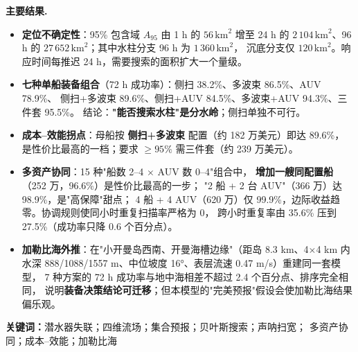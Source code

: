 \documentclass[UTF8,11pt,a4paper]{ctexart}
\newcommand{\km}{\,\mathrm{km}}
\begin{document}
\vspace{1.5mm}
\noindent\textbf{主要结果.}
\begin{itemize}[leftmargin=1.6em,itemsep=0pt,topsep=1pt]
\item \textbf{定位不确定性}：95\% 包含域 $A_{95}$ 由 1 h 的 $56\km^2$ 增至 24 h 的
      $2\,104\km^2$、96 h 的 $27\,652\km^2$；其中水柱分支 96 h 为 $1\,360\km^2$，
      沉底分支仅 $120\km^2$。响应时间每推迟 24 h，需要搜索的面积扩大一个量级。
\item \textbf{七种单船装备组合}（72 h 成功率）：侧扫 38.2\%、多波束 86.5\%、AUV 78.9\%、
      侧扫+多波束 89.6\%、侧扫+AUV 84.5\%、多波束+AUV 94.3\%、三件套 95.5\%。
      结论：\textbf{"能否搜索水柱"是分水岭}；侧扫单独不可行。
\item \textbf{成本–效能拐点}：母船按 \textbf{侧扫+多波束} 配置（约 182 万美元）即达 89.6\%，
      是性价比最高的一档；要求 $\ge95\%$ 需三件套（约 239 万美元）。
\item \textbf{多资产协同}：15 种"船数 2--4 $\times$ AUV 数 0--4"组合中，
      \textbf{增加一艘同配置船}（252 万，96.6\%）是性价比最高的一步；
      "2 船 + 2 台 AUV"（366 万）达 98.9\%，是"高保障"甜点；
      4 船 + 4 AUV（620 万）仅 99.9\%，边际收益趋零。协调规则使同小时重复扫描率严格为 0，
      跨小时重复率由 35.6\% 压到 27.5\%（成功率只降 0.6 个百分点）。
\item \textbf{加勒比海外推}：在"小开曼岛西南、开曼海槽边缘"（距岛 8.3 km、4$\times$4 km 内
      水深 888/1088/1557 m、中位坡度 16°、表层流速 0.47 m/s）重建同一套模型，
      7 种方案的 72 h 成功率与地中海相差不超过 2.4 个百分点、排序完全相同，
      说明\textbf{装备决策结论可迁移}；但本模型的"完美预报"假设会使加勒比海结果偏乐观。
\end{itemize}

\vspace{1mm}
\noindent\textbf{关键词：}潜水器失联；四维流场；集合预报；贝叶斯搜索；声呐扫宽；
多资产协同；成本–效能；加勒比海

\newpage

\setcounter{tocdepth}{1}
\tableofcontents
\newpage












\end{document}
